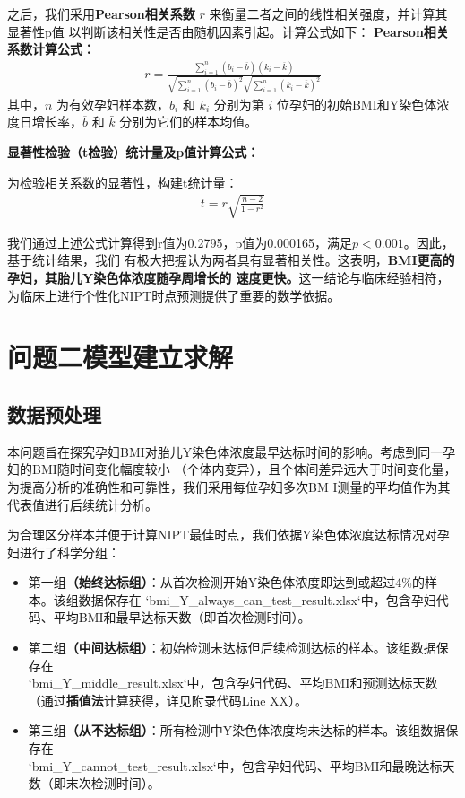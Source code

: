\documentclass{article}
\begin{document}
之后，我们采用\textbf{Pearson相关系数} $r$ 来衡量二者之间的线性相关强度，并计算其显著性p值
以判断该相关性是否由随机因素引起。计算公式如下：
\textbf{Pearson相关系数计算公式：}
\begin{gather}
    r=\frac{\sum_{i=1}^{n}(b_i-\overline{b})(k_i-\overline{k})}{\sqrt{\sum_{i=1}^{n}(b_i-\overline{b})^2}\sqrt{\sum_{i=1}^{n}(k_i-\overline{k})^2}} \tag{3}
\end{gather}
其中，$n$ 为有效孕妇样本数，$b_i$ 和 $k_i$ 分别为第 $i$ 位孕妇的初始BMI和Y染色体浓度日增长率，$\overline{b}$ 和 $\bar{k}$ 分别为它们的样本均值。

\textbf{显著性检验（t检验）统计量及p值计算公式：}

为检验相关系数的显著性，构建t统计量：
\begin{gather}
    t=r\sqrt{\frac{n-2}{1-r^2}} \tag{4}
\end{gather}

我们通过上述公式计算得到r值为0.2795，p值为0.000165，满足$p < 0.001$。因此，基于统计结果，我们
有极大把握认为两者具有显著相关性。这表明，\textbf{BMI更高的孕妇，其胎儿Y染色体浓度随孕周增长的
    速度更快。}这一结论与临床经验相符，为临床上进行个性化NIPT时点预测提供了重要的数学依据。
\section{\textbf{问题二模型建立求解}}
\subsection{\textbf{数据预处理}}
本问题旨在探究孕妇BMI对胎儿Y染色体浓度最早达标时间的影响。考虑到同一孕妇的BMI随时间变化幅度较小
（个体内变异），且个体间差异远大于时间变化量，为提高分析的准确性和可靠性，我们采用每位孕妇多次BM
I测量的平均值作为其代表值进行后续统计分析。

为合理区分样本并便于计算NIPT最佳时点，我们依据Y染色体浓度达标情况对孕妇进行了科学分组：
\begin{itemize}
    \item 第一组\textbf{（始终达标组）}：从首次检测开始Y染色体浓度即达到或超过4\%的样本。该组数据保存在 `bmi\_Y\_always\_can\_test\_result.xlsx`中，包含孕妇代码、平均BMI和最早达标天数（即首次检测时间）。
    \item 第二组\textbf{（中间达标组）}：初始检测未达标但后续检测达标的样本。该组数据保存在 \\
          `bmi\_Y\_middle\_result.xlsx`中，包含孕妇代码、平均BMI和预测达标天数（通过\textbf{插值法}计算获得，详见附录代码Line XX）。
    \item 第三组\textbf{（从不达标组）}：所有检测中Y染色体浓度均未达标的样本。该组数据保存在 \\
          `bmi\_Y\_cannot\_test\_result.xlsx`中，包含孕妇代码、平均BMI和最晚达标天数（即末次检测时间）。
\end{itemize}
\end{document}
